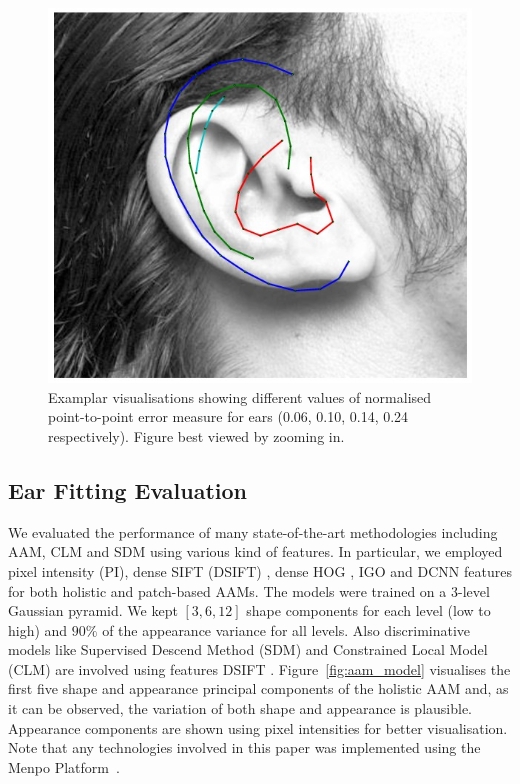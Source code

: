 \begin{figure}[!t]
    \hfill
    \includegraphics[height=\flowh]{resources/Ear_Deformable_Model/ear_24}
\caption{Examplar visualisations showing different values of normalised point-to-point error measure for ears (0.06, 0.10, 0.14, 0.24 respectively). Figure best viewed by zooming in.}
\label{fig:ear_error}
\end{figure}


\subsection{Ear Fitting Evaluation}
\label{sec:ear_benchmark_fitting}

We evaluated the performance of many state-of-the-art methodologies including AAM, CLM and SDM using various kind of features. In particular, we employed pixel intensity (PI), dense SIFT (DSIFT) \cite{lowe1999object}, dense HOG \cite{Dalal2005}, IGO \cite{tzimiropoulos2012subspace} and DCNN \cite{sermanet2013overfeat} features for both holistic and patch-based AAMs. The models were trained on a 3-level Gaussian pyramid. We kept $[3, 6, 12]$ shape components for each level (low to high) and $90\%$ of the appearance variance for all levels. Also discriminative models like Supervised Descend Method (SDM) \cite{xiong2013supervised} and Constrained Local Model (CLM) \cite{cristinacce2006feature}  are involved using features DSIFT \cite{lowe1999object}. Figure~\ref{fig:aam_model} visualises the first five shape and appearance principal components of the holistic AAM and, as it can be observed, the variation of both shape and appearance is plausible. Appearance components are shown using pixel intensities for better visualisation. Note that any technologies involved in this paper was implemented using the Menpo Platform~\cite{alabort2014menpo}.

